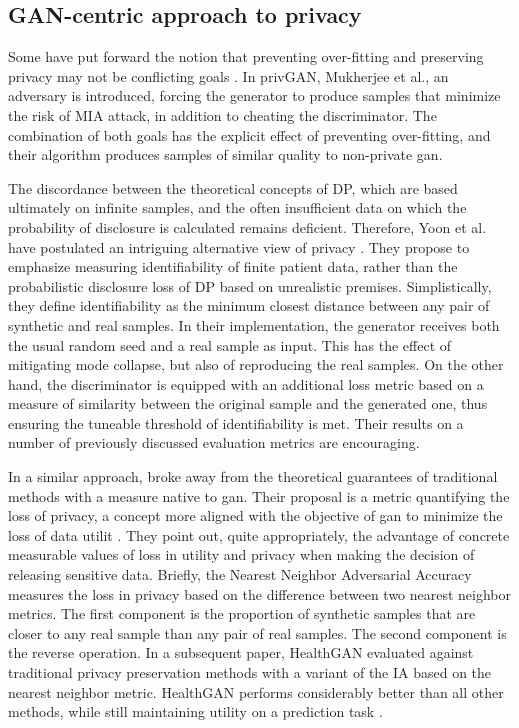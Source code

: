     \subsection{GAN-centric approach to privacy}
        Some have put forward the notion that preventing over-fitting and preserving privacy may not be conflicting goals \cite{Wu2019-ui,Mukherjee2019-vu}. In privGAN, Mukherjee et al., an adversary is introduced, forcing the generator to produce samples that minimize the risk of MIA attack, in addition to cheating the discriminator. The combination of both goals has the explicit effect of preventing over-fitting, and their algorithm produces samples of similar quality to non-private \gls{gan}.\par
        
        The discordance between the theoretical concepts of DP, which are  based ultimately on infinite samples, and the often insufficient data on which the probability of disclosure is calculated remains deficient. Therefore, Yoon et al. have postulated an intriguing alternative view of privacy \cite{Yoon2020-anon}. They propose to emphasize measuring identifiability of finite patient data, rather than the probabilistic disclosure loss of DP based on unrealistic premises. Simplistically, they define identifiability as the minimum closest distance between any pair of synthetic and real samples. In their implementation, the generator receives both the usual random seed and a real sample as input. This has the effect of mitigating mode collapse, but also of reproducing the real samples. On the other hand, the discriminator is equipped with an additional loss metric based on a measure of similarity between the original sample and the generated one, thus ensuring the tuneable threshold of identifiability is met. Their results on a number of previously discussed evaluation metrics are encouraging.\par
        
        In a similar approach, \citeauthor{Yale_2020} broke away from the theoretical guarantees of traditional methods with a measure native to \gls{gan}. Their proposal is a metric quantifying the loss of privacy, a concept more aligned with the objective of \gls{gan} to minimize the loss of data utilit \cite{yale:hal-02160496,p2019}. They point out, quite appropriately, the advantage of concrete measurable values of loss in utility and privacy when making the decision of releasing sensitive data. Briefly, the Nearest Neighbor Adversarial Accuracy measures the loss in privacy based on the difference between two nearest neighbor metrics. The  first component is the proportion of synthetic samples that are closer to any real sample than any pair of real samples. The second component is the reverse operation. In a subsequent paper, HealthGAN evaluated against traditional privacy preservation methods with a variant of the IA based on the nearest neighbor metric. HealthGAN performs considerably better than all other methods, while still maintaining utility on a prediction task .


       



